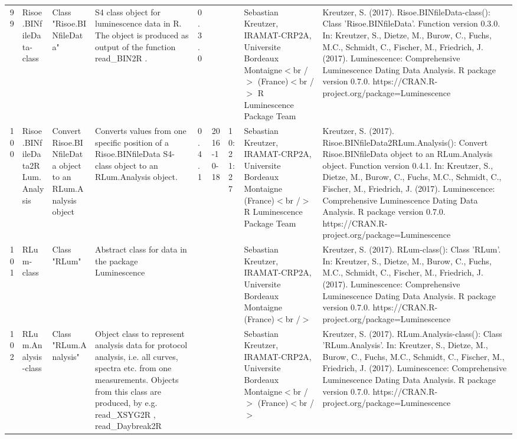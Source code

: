 \begin{table}[ht]
\begin{tabular}{rllllllll}
 \\ 
  99 & Risoe.BINfileData-class & Class  "Risoe.BINfileData" & S4 class object for luminescence data in R. The object is produced as output of the function  read\_BIN2R . & 0.3.0
 &  &  & Sebastian Kreutzer, IRAMAT-CRP2A, Universite Bordeaux Montaigne$<$br /$>$ (France)$<$br /$>$  R Luminescence Package Team & Kreutzer, S. (2017). Risoe.BINfileData-class(): Class 'Risoe.BINfileData'. Function version 0.3.0. In: Kreutzer, S., Dietze, M., Burow, C., Fuchs, M.C., Schmidt, C., Fischer, M., Friedrich, J. (2017). Luminescence: Comprehensive Luminescence Dating Data Analysis. R package version 0.7.0. https://CRAN.R-project.org/package=Luminescence
 \\ 
  100 & Risoe.BINfileData2RLum.Analysis & Convert Risoe.BINfileData object to an RLum.Analysis object & Converts values from one specific position of a Risoe.BINfileData S4-class object to an RLum.Analysis object. & 0.4.1 & 2016-10-18 & 10:21:27
 & Sebastian Kreutzer, IRAMAT-CRP2A, Universite Bordeaux Montaigne (France)$<$br /$>$  R Luminescence Package Team & Kreutzer, S. (2017). Risoe.BINfileData2RLum.Analysis(): Convert Risoe.BINfileData object to an RLum.Analysis object. Function version 0.4.1. In: Kreutzer, S., Dietze, M., Burow, C., Fuchs, M.C., Schmidt, C., Fischer, M., Friedrich, J. (2017). Luminescence: Comprehensive Luminescence Dating Data Analysis. R package version 0.7.0. https://CRAN.R-project.org/package=Luminescence
 \\ 
  101 & RLum-class & Class  "RLum" & Abstract class for data in the package Luminescence &  &  &  & Sebastian Kreutzer, IRAMAT-CRP2A, Universite Bordeaux Montaigne (France)$<$br /$>$ & Kreutzer, S. (2017). RLum-class(): Class 'RLum'. In: Kreutzer, S., Dietze, M., Burow, C., Fuchs, M.C., Schmidt, C., Fischer, M., Friedrich, J. (2017). Luminescence: Comprehensive Luminescence Dating Data Analysis. R package version 0.7.0. https://CRAN.R-project.org/package=Luminescence
 \\ 
  102 & RLum.Analysis-class & Class  "RLum.Analysis" & Object class to represent analysis data for protocol analysis, i.e. all curves, spectra etc. from one measurements. Objects from this class are produced, by e.g.  read\_XSYG2R , read\_Daybreak2R &  &  &  & Sebastian Kreutzer, IRAMAT-CRP2A, Universite Bordeaux Montaigne$<$br /$>$ (France)$<$br /$>$ & Kreutzer, S. (2017). RLum.Analysis-class(): Class 'RLum.Analysis'. In: Kreutzer, S., Dietze, M., Burow, C., Fuchs, M.C., Schmidt, C., Fischer, M., Friedrich, J. (2017). Luminescence: Comprehensive Luminescence Dating Data Analysis. R package version 0.7.0. https://CRAN.R-project.org/package=Luminescence

\end{tabular}
\end{table}
